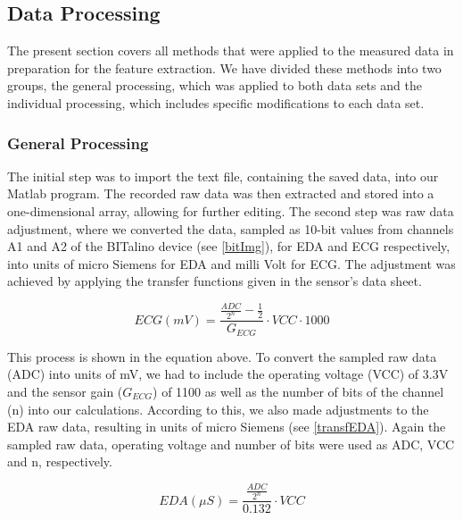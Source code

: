 \subsection{Data Processing}
The present section covers all methods that were applied to the measured data in preparation for the feature extraction. We have divided these methods into two groups, the general processing, which was applied to both data sets and the individual processing, which includes specific modifications to each data set.

\subsubsection{General Processing}\label{generalproc}
The initial step was to import the text file, containing the saved data, into our Matlab program. The recorded raw data was then extracted and stored into a one-dimensional array, allowing for further editing. 
The second step was raw data adjustment, where we converted the data, sampled as 10-bit values from channels A1 and A2 of the BITalino device (see \ref{bitImg}), for EDA and ECG respectively, into units of micro Siemens for EDA and milli Volt for ECG. The adjustment was achieved by applying the transfer functions given in the sensor's data sheet.

\begin{equation}\label{transfECG}
ECG(mV) = \frac{\frac{ADC}{2^{n}}-\frac{1}{2}}{G_{ECG}} \cdot VCC \cdot 1000 
\end{equation}

This process is shown in the equation above. To convert the sampled raw data (ADC) into units of mV, we had to include the operating voltage (VCC) of 3.3V and the sensor gain ($G_{ECG}$) of 1100 as well as the number of bits of the channel (n) into our calculations. According to this, we also made adjustments to the EDA raw data, resulting in units of micro Siemens (see \ref{transfEDA}). Again the sampled raw data, operating voltage and number of bits were used as ADC, VCC and n, respectively. 
 
\begin{equation}\label{transfEDA}
EDA (\mu S) = \frac{\frac{ADC}{2^{n}}}{0.132} \cdot VCC
\end{equation}

%
%

